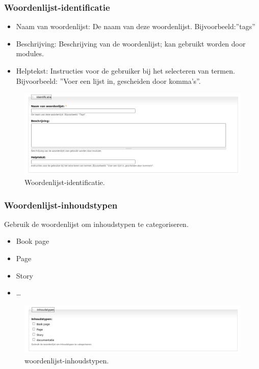 \subsubsection{Woordenlijst-identificatie} 
\begin{itemize}
\item Naam van woordenlijst: De naam van deze woordenlijst. Bijvoorbeeld:''tags''
\item Beschrijving: Beschrijving van de woordenlijst; kan gebruikt worden door
modules.
\item Helptekst: Instructies voor de gebruiker bij het selecteren van termen.
Bijvoorbeeld: ''Voer een lijst in, gescheiden door komma's''.
\end{itemize}
\begin{figure}[!h]
    \centering
   \includegraphics[scale=0.3,angle=0]{woordenlijst-identificatie}
   \caption{Woordenlijst-identificatie.\label{white}}
 \end{figure}
 \subsubsection{Woordenlijst-inhoudstypen}
 Gebruik de woordenlijst om inhoudstypen te categoriseren.
\begin{itemize}
\item Book page
\item Page
\item Story
\item \ldots
\end{itemize}
\begin{figure}[!h]
    \centering
   \includegraphics[scale=0.3,angle=0]{woordenlijst-inhoudstypen}
   \caption{woordenlijst-inhoudstypen.\label{white}}
 \end{figure}

